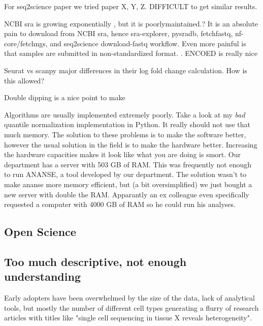 For seq2science paper we tried paper X, Y, Z. DIFFICULT to get similar results.     

% 

NCBI sra is growing exponentially \cite{srawebsite}, but it is poorlymaintained.? It is an absolute pain to download from NCBI sra, hence sra-explorer, pysradb, fetchfastq, nf-core/fetchngs, and seq2science download-fastq workflow. Even more painful is that samples are submitted in non-standardized format. . ENCOED is really nice

Seurat vs scanpy major differences in their log fold change calculation. How is this allowed?

Double dipping is a nice point to make

Algorithms are usually implemented extremely poorly. Take a look at my \textit{bad} quantile normalization implementation in Python. It really should not use that much memory. The solution to these problems is to make the software better, however the usual solution in the field is to make the hardware better. Increasing the hardware capacities makes it look like what you are doing is smort. Our department has a server with 503 GB of RAM. This was frequently not enough to run ANANSE, a tool developed by our department. The solution wasn't to make ananse more memory efficient, but (a bit oversimplified) we just bought a new server with double the RAM. Apparantly an ex colleague even specifically requested a computer with 4000 GB of RAM so he could run his analyses. 

\subsection{Open Science}



\subsection{Too much descriptive, not enough understanding}

Early adopters have been overwhelmed by the size of the data, lack of analytical tools, but mostly the number of different cell types generating a flurry of research articles with titles like "single cell sequencing in tissue X reveals heterogeneity".  

